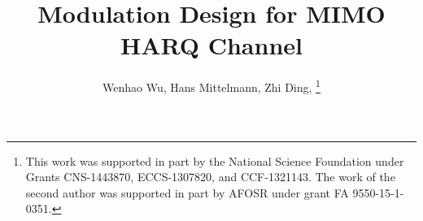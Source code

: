 \documentclass[journal,draftcls,onecolumn,12pt,twoside]{IEEEtran}
\begin{document}
%
\title{Modulation Design for MIMO HARQ Channel}
%
%
%

\author{
  Wenhao Wu,
  Hans Mittelmann,
  Zhi Ding,
  \thanks{
    This work was supported in part by the National Science Foundation
    under Grants CNS-1443870, ECCS-1307820, and CCF-1321143. The work of the
    second author was supported in part by AFOSR under grant FA 9550-15-1-0351.
  }%
}

% 
%



% 
\end{document}

